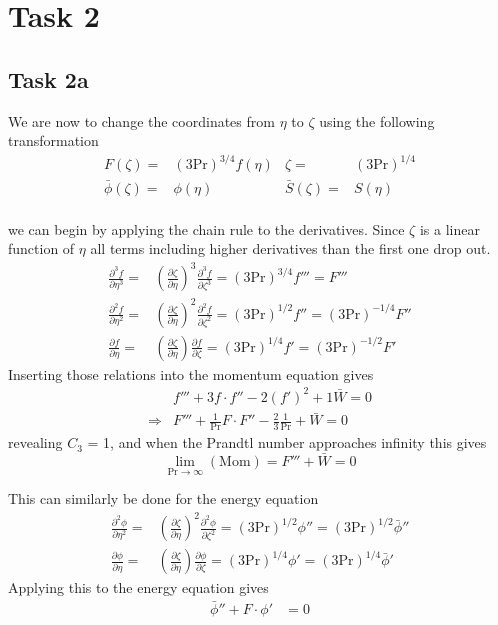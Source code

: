 \section*{Task 2} %
\label{sec:Task 2}
	\subsection*{Task 2a}
	We are now to change the coordinates from $\eta$ to $\zeta$ using the following transformation
	\begin{align*}
	  F(\zeta) =& (3\text{Pr})^{3/4} f(\eta) & \zeta =& (3 \text{Pr})^{1/4} \\
	  \bar{\phi}(\zeta) =& \phi (\eta) & \bar{S}(\zeta) =& S(\eta )\\
	\end{align*}

	we can begin by applying the chain rule to the derivatives. Since $\zeta$ is a linear function of $\eta$ all terms including higher derivatives than the first one drop out.
	\begin{align*}
	  \frac{\partial^3 f}{\partial \eta^3}=& \left( \frac{\partial \zeta}{\partial \eta} \right)^3 \frac{\partial^3 f}{\partial \zeta^3}=(3 \text{Pr})^{3/4}f'''=F'''\\
	  \frac{\partial^2 f}{\partial \eta^2}=& \left( \frac{\partial \zeta}{\partial \eta} \right)^2 \frac{\partial^2 f}{\partial \zeta^2}=(3 \text{Pr})^{1/2}f''=(3 \text{Pr})^{-1/4} F''\\
	  \frac{\partial f}{\partial \eta}=& \left( \frac{\partial \zeta}{\partial \eta} \right) \frac{\partial f}{\partial \zeta}=(3 \text{Pr})^{1/4}f'=(3 \text{Pr})^{-1/2}F'
	\end{align*}
	Inserting those relations into the momentum equation gives
	\begin{align*}
	  &f'''+3f\cdot f'' -2(f')^2 + 1 \bar{W} = 0 \\
	  \Rightarrow& F''' +\frac{1}{\text{Pr}}F\cdot F'' -\frac{2}{3}\frac{1}{\text{Pr}}+\bar{W}=0 
	\end{align*}
	revealing $C_3$ = 1, and when the Prandtl number approaches infinity this gives
	\begin{equation*}
	  \lim_{\text{Pr}\rightarrow \infty} (\text{Mom}) = F'''+\bar{W} =0
	\end{equation*}

	This can similarly be done for the energy equation
	\begin{align*}
	  \frac{\partial^2 \phi}{\partial \eta^2}=& \left( \frac{\partial \zeta}{\partial \eta} \right)^2 \frac{\partial^2 \phi}{\partial \zeta^2}=(3 \text{Pr})^{1/2}\phi'' =(3 \text{Pr})^{1/2}\bar{\phi}'' \\
	  \frac{\partial \phi}{\partial \eta}=& \left( \frac{\partial \zeta}{\partial \eta} \right) \frac{\partial \phi}{\partial \zeta}=(3 \text{Pr})^{1/4}\phi' =(3 \text{Pr})^{1/4}\bar{\phi}' 
	\end{align*}
	Applying this to the energy equation gives
	\begin{align*}
	  \bar{\phi}''+F\cdot\phi'&=0
	\end{align*}

